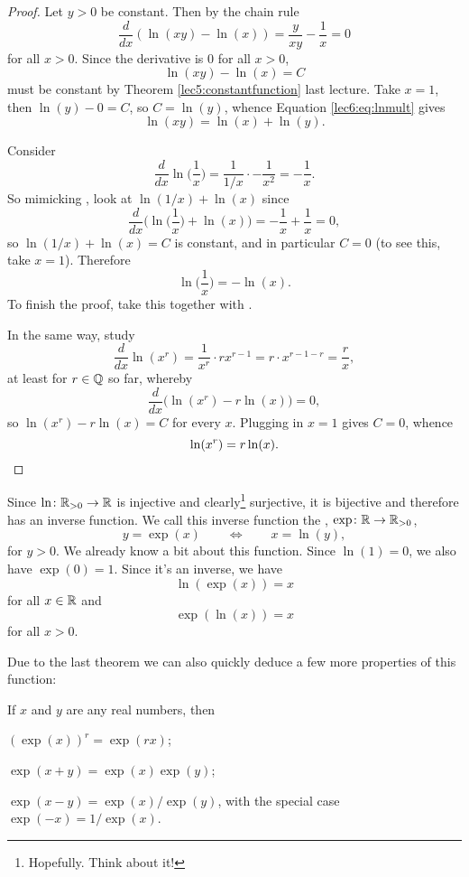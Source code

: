 \begin{proof}
	 Let $y > 0$ be constant.
	Then by the chain rule
	\[
		\frac{d}{d x} (\ln(x y) - \ln(x)) = \frac{y}{x y} - \frac{1}{x} = 0
	\]
	for all $x > 0$.
	Since the derivative is $0$ for all $x > 0$,
	\begin{equation}\label{lec6:eq:lnmult}
		\ln(x y) - \ln(x) = C
	\end{equation}
	must be constant by Theorem \ref{lec5:constantfunction} last lecture.
	Take $x = 1$, then $\ln(y) - 0 = C$, so $C = \ln(y)$, whence Equation \eqref{lec6:eq:lnmult} gives
	\[
		\ln(x y) = \ln(x) + \ln(y).
	\]

	 Consider
	\[
		\frac{d}{d x} \ln \Big ( \frac{1}{x} \Big ) = \frac{1}{1 / x} \cdot - \frac{1}{x^2} = - \frac{1}{x}.
	\]
	So mimicking , look at $\ln(1 / x) + \ln(x)$ since
	\[
		\frac{d}{d x} \Big ( \ln \big ( \frac{1}{x} \big ) + \ln(x) \Big ) = - \frac{1}{x} + \frac{1}{x} = 0,
	\]
	so $\ln(1 / x) + \ln(x) = C$ is constant, and in particular $C = 0$ (to see this, take $x = 1$).
	Therefore
	\[
		\ln \Big ( \frac{1}{x} \Big ) = - \ln(x).
	\]
	To finish the proof, take this together with .

	 In the same way, study
	\[
		\frac{d}{d x} \ln(x^r) = \frac{1}{x^r} \cdot r x^{r - 1} = r \cdot x^{r - 1 - r} = \frac{r}{x},
	\]
	at least for $r \in \mathbb{Q}$ so far, whereby
	\[
		\frac{d}{d x} \big ( \ln(x^r) - r \ln(x) \big ) = 0,
	\]
	so $\ln(x^r) - r \ln(x) = C$ for every $x$.
	Plugging in $x = 1$ gives $C = 0$, whence
	\[
		\ln(x^r) = r \ln(x). \qedhere
	\]
\end{proof}


Since $\ln \colon \mathbb{R}_{> 0} \to \mathbb{R}$ is injective and clearly\footnote{Hopefully. Think about it!} surjective, it is bijective and therefore has an inverse function.
We call this inverse function the , $\exp \colon \mathbb{R} \to \mathbb{R}_{> 0}$,
\[
	y = \exp(x) \qquad \Longleftrightarrow \qquad x = \ln(y),
\]
for $y > 0$.
We already know a bit about this function.
Since $\ln(1) = 0$, we also have $\exp(0) = 1$.
Since it's an inverse, we have
\[
	\ln(\exp(x)) = x
\]
for all $x \in \mathbb{R}$ and
\[
	\exp(\ln(x)) = x
\]
for all $x > 0$.

Due to the last theorem we can also quickly deduce a few more properties of this function:

\begin{theorem}
	If $x$ and $y$ are any real numbers, then
	\begin{romanlist}
		\item $(\exp(x))^r = \exp(r x)$;
		\item $\exp(x + y) = \exp(x) \exp(y)$;
		\item $\exp(x - y) = \exp(x) / \exp(y)$, with the special case $\exp(-x) = 1 / \exp(x)$.
	\end{romanlist}
\end{theorem}


